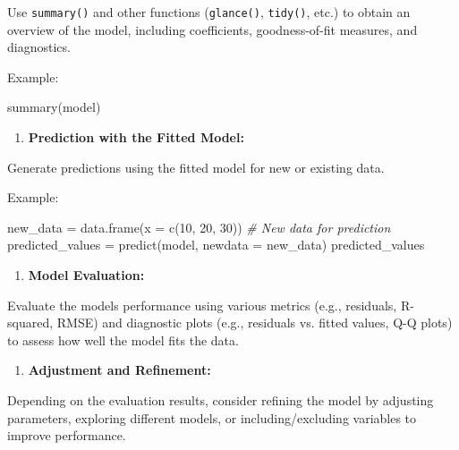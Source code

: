 \documentclass[
]{article}
\newenvironment{Shaded}{}{}
\newcommand{\AttributeTok}[1]{\textcolor[rgb]{0.49,0.56,0.16}{#1}}
\newcommand{\CommentTok}[1]{\textcolor[rgb]{0.38,0.63,0.69}{\textit{#1}}}
\newcommand{\DecValTok}[1]{\textcolor[rgb]{0.25,0.63,0.44}{#1}}
\newcommand{\FunctionTok}[1]{\textcolor[rgb]{0.02,0.16,0.49}{#1}}
\newcommand{\NormalTok}[1]{#1}
\newcommand{\OtherTok}[1]{\textcolor[rgb]{0.00,0.44,0.13}{#1}}
\begin{document}
Use \texttt{summary()} and other functions (\texttt{glance()},
\texttt{tidy()}, etc.) to obtain an overview of the model, including
coefficients, goodness-of-fit measures, and diagnostics.

Example:

\begin{Shaded}
\begin{Highlighting}[]
\FunctionTok{summary}\NormalTok{(model)}
\end{Highlighting}
\end{Shaded}

\begin{enumerate}
\def\labelenumi{\arabic{enumi}.}
\item
  \textbf{Prediction with the Fitted Model:}
\end{enumerate}

Generate predictions using the fitted model for new or existing data.

Example:

\begin{Shaded}
\begin{Highlighting}[]
\NormalTok{new\_data }\OtherTok{=} \FunctionTok{data.frame}\NormalTok{(}\AttributeTok{x =} \FunctionTok{c}\NormalTok{(}\DecValTok{10}\NormalTok{, }\DecValTok{20}\NormalTok{, }\DecValTok{30}\NormalTok{))  }\CommentTok{\# New data for prediction}
\NormalTok{predicted\_values }\OtherTok{=} \FunctionTok{predict}\NormalTok{(model, }\AttributeTok{newdata =}\NormalTok{ new\_data)}
\NormalTok{predicted\_values}
\end{Highlighting}
\end{Shaded}

\begin{enumerate}
\def\labelenumi{\arabic{enumi}.}
\item
  \textbf{Model Evaluation:}
\end{enumerate}

Evaluate the model\textquotesingle s performance using various metrics
(e.g., residuals, R-squared, RMSE) and diagnostic plots (e.g., residuals
vs. fitted values, Q-Q plots) to assess how well the model fits the
data.

\begin{enumerate}
\def\labelenumi{\arabic{enumi}.}
\item
  \textbf{Adjustment and Refinement:}
\end{enumerate}

Depending on the evaluation results, consider refining the model by
adjusting parameters, exploring different models, or including/excluding
variables to improve performance.
\end{document}

